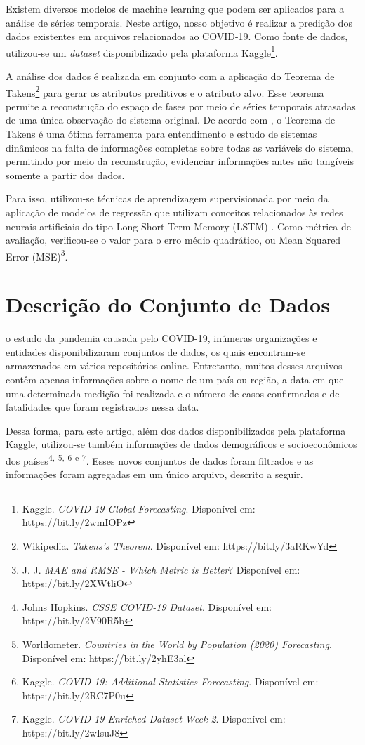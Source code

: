\documentclass{ieeeaccess}
\begin{document}
Existem diversos modelos de machine learning que podem ser aplicados para a análise de séries temporais. Neste artigo, nosso objetivo é realizar a predição dos dados existentes em arquivos relacionados ao COVID-19. Como fonte de dados, utilizou-se um \textit{dataset} disponibilizado pela plataforma Kaggle\footnote{Kaggle. \textit{COVID-19 Global Forecasting}. Disponível em: https://bit.ly/2wmIOPz}. 

A análise dos dados é realizada em conjunto com a aplicação do Teorema de Takens\footnote{Wikipedia. \textit{Takens's Theorem}. Disponível em: https://bit.ly/3aRKwYd} para gerar os atributos preditivos e o atributo alvo. Esse teorema permite a reconstrução do espaço de fases por meio de séries temporais atrasadas de uma única observação do sistema original. De acordo com \cite{b17}, o Teorema de Takens é uma ótima ferramenta para entendimento e estudo de sistemas dinâmicos na falta de informações completas sobre todas as variáveis do sistema, permitindo por meio da reconstrução, evidenciar informações antes não tangíveis somente a partir dos dados.

Para isso, utilizou-se técnicas de aprendizagem supervisionada por meio da aplicação de modelos de regressão que utilizam conceitos relacionados às redes neurais artificiais do tipo Long Short Term Memory (LSTM) \cite{b18}. Como métrica de avaliação, verificou-se o valor para o erro médio quadrático, ou Mean Squared Error (MSE)\footnote{J. J. \textit{MAE and RMSE - Which Metric is Better}? Disponível em: https://bit.ly/2XWtliO}.

\section{Descrição do Conjunto de Dados}

\label{sec:introduction}  o estudo da pandemia causada pelo COVID-19, inúmeras organizações e entidades disponibilizaram conjuntos de dados, os quais encontram-se armazenados em vários repositórios online. Entretanto, muitos desses arquivos contêm apenas informações sobre o nome de um país ou região, a data em que uma determinada medição foi realizada e o número de casos confirmados e de fatalidades que foram registrados nessa data. 

Dessa forma, para este artigo, além dos dados disponibilizados pela plataforma Kaggle, utilizou-se também informações de dados demográficos e socioeconômicos dos países\footnote{Johns Hopkins. \textit{CSSE COVID-19 Dataset}. Disponível em: https://bit.ly/2V90R5b}\textsuperscript{,} \footnote{Worldometer. \textit{Countries in the World by Population (2020) Forecasting}. Disponível em: https://bit.ly/2yhE3al}\textsuperscript{,} \footnote{Kaggle. \textit{COVID-19: Additional Statistics Forecasting}. Disponível em: https://bit.ly/2RC7P0u} \textsuperscript{e} \footnote{Kaggle. \textit{COVID-19 Enriched Dataset Week 2}. Disponível em: https://bit.ly/2wIsuJ8}. Esses novos conjuntos de dados foram filtrados e as informações foram agregadas em um único arquivo, descrito a seguir.
\end{document}
